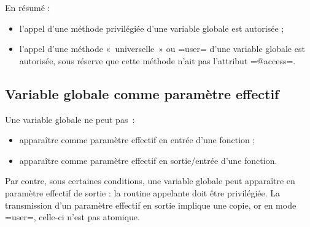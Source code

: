 En résumé :
\begin{itemize}
  \item l'appel d'une méthode privilégiée d'une variable globale est autorisée ;
  \item l'appel d'une méthode «~universelle~» ou \plm=user= d'une variable globale est autorisée, sous réserve que cette méthode n'ait pas l'attribut \plm=@access=.
\end{itemize}








\subsection{Variable globale comme paramètre effectif}

Une variable globale ne peut pas~:

\begin{itemize}
  \item apparaître comme paramètre effectif en entrée d'une fonction ;
  \item apparaître comme paramètre effectif en sortie/entrée d'une fonction.
\end{itemize}

Par contre, sous certaines conditions, une variable globale peut apparaître en paramètre effectif de sortie : la routine appelante doit être privilégiée. La transmission d'un paramètre effectif en sortie implique une copie, or en mode \plm=user=, celle-ci n'est pas atomique.


